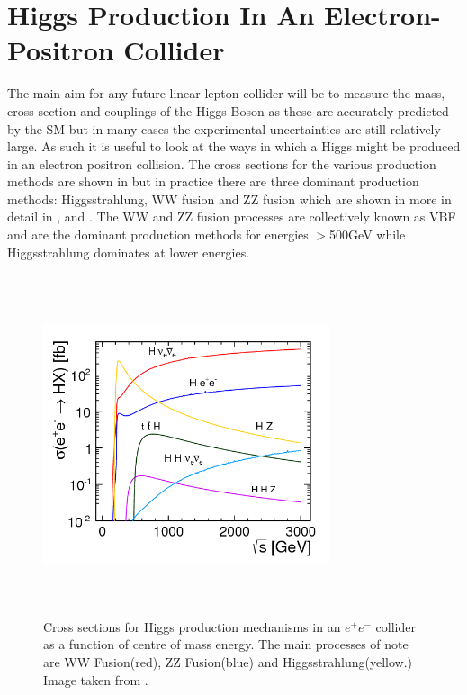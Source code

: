 \section{Higgs Production In An Electron-Positron Collider}
The main aim for any future linear lepton collider will be to measure the mass, cross-section and couplings of the Higgs Boson as these are accurately predicted by the \ac{SM} but in many cases the experimental uncertainties are still relatively large. As such it is useful to look at the ways in which a Higgs might be produced in an electron positron collision. The cross sections for the various production methods are shown in  but in practice there are three dominant production methods: Higgsstrahlung, WW fusion and ZZ fusion which are shown in more in detail in ,  and . The WW and ZZ fusion processes are collectively known as \ac{VBF} and are the dominant production methods for energies ${>}$500GeV while Higgsstrahlung dominates at lower energies.
\begin{figure}
  \centering
  \includegraphics[width=0.75\textwidth,height=10cm,keepaspectratio]{fig/HiggsCrossSections}
  \caption[Higgs Cross Sections]{Cross sections for Higgs production mechanisms in an ${e^+e^-}$ collider as a function of centre of mass energy. The main processes of note are WW Fusion(red), ZZ Fusion(blue) and Higgsstrahlung(yellow.) Image taken from \cite{Simon:2014aqa}. }
  \label{Fig:HiggsCrossSections}
\end{figure}

